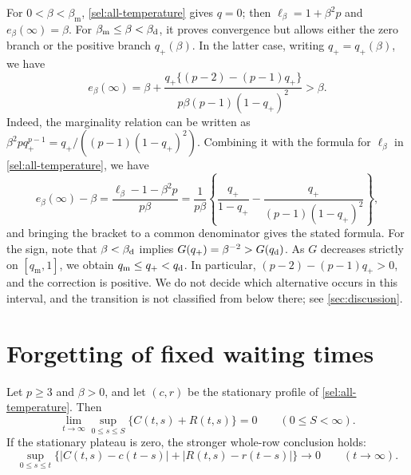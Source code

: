 \begin{remark}\label{sel:intermediate-range}
For $0<\beta<\beta_{\mathrm m}$, \cref{sel:all-temperature} gives $q=0$; then $\ell_\beta=1+\beta^2p$ and $e_\beta(\infty)=\beta$. For $\beta_{\mathrm m}\le\beta<\beta_{\mathrm d}$, it proves convergence but allows either the zero branch or the positive branch $q_+(\beta)$. In the latter case, writing $q_+=q_+(\beta)$, we have
\[
 e_\beta(\infty)=\beta+
 \frac{q_+\{(p-2)-(p-1)q_+\}}{p\beta(p-1)(1-q_+)^2}>\beta.
\]
Indeed, the marginality relation can be written as $\beta^2pq_+^{p-1}=q_+/((p-1)(1-q_+)^2)$. Combining it with the formula for $\ell_\beta$ in \cref{sel:all-temperature}, we have
\[
 e_\beta(\infty)-\beta=\frac{\ell_\beta-1-\beta^2p}{p\beta}
 =\frac1{p\beta}\left\{\frac{q_+}{1-q_+}-\frac{q_+}{(p-1)(1-q_+)^2}\right\},
\]
and bringing the bracket to a common denominator gives the stated formula. For the sign, note that $\beta<\beta_{\mathrm d}$ implies $G(q_+)=\beta^{-2}>G(q_{\mathrm d})$. As $G$ decreases strictly on $[q_{\mathrm m},1]$, we obtain $q_{\mathrm m}\le q_+<q_{\mathrm d}$. In particular, $(p-2)-(p-1)q_+>0$, and the correction is positive. We do not decide which alternative occurs in this interval, and the transition is not classified from below there; see \cref{sec:discussion}.
\end{remark}

\section{Forgetting of fixed waiting times}\label{sec:forgetting}

\begin{theorem}\label{sel:fixed-wait-forgetting}
Let $p\ge3$ and $\beta>0$, and let $(c,r)$ be the stationary profile of \cref{sel:all-temperature}. Then
\begin{equation}
 \lim_{t\to\infty}\sup_{0\le s\le S}
       \bigl\{C(t,s)+R(t,s)\bigr\}=0\qquad(0\le S<\infty).
 \label{sel:fixed-wait-decay}
\end{equation}
If the stationary plateau is zero, the stronger whole-row conclusion holds:
\begin{equation}
 \sup_{0\le s\le t}
 \bigl\{|C(t,s)-c(t-s)|+|R(t,s)-r(t-s)|\bigr\}
 \longrightarrow0\qquad(t\to\infty).
 \label{sel:zero-plateau-whole-row}
\end{equation}
\end{theorem}


